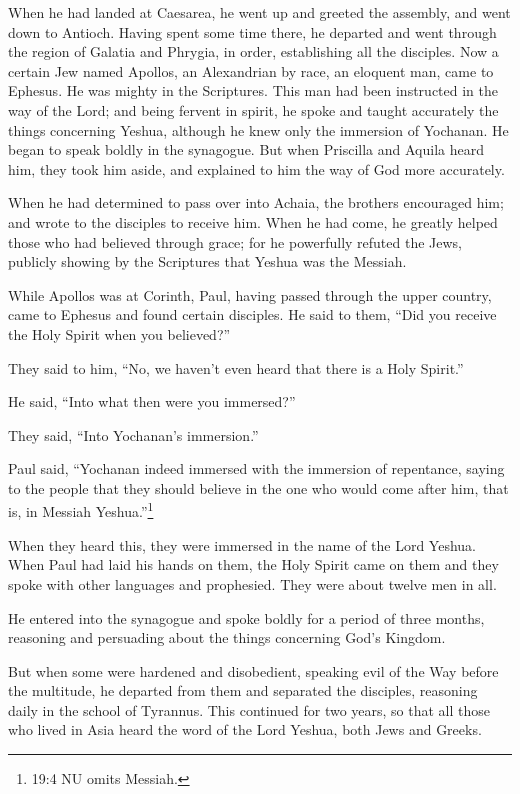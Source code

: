 \myverse{}When he had landed at Caesarea, he went up and greeted the assembly,
and went down to Antioch.
\myverse{}Having spent some time there, he departed and went through the region of
Galatia and Phrygia, in order, establishing all the disciples.
\myverse{}Now a certain Jew named Apollos, an Alexandrian by race, an eloquent man,
came to Ephesus. He was mighty in the Scriptures.
\myverse{}This man had been instructed in the way of the Lord; and being fervent in
spirit, he spoke and taught accurately the things concerning Yeshua, although he knew only the immersion
of Yochanan.
\myverse{}He began to speak boldly in the synagogue. But when Priscilla and Aquila
heard him, they took him aside, and explained to him the way of God more accurately.

\myverse{}When he had determined to pass over into Achaia, the brothers
encouraged him; and wrote to the disciples to receive him. When he had come, he greatly helped those who
had believed through grace;
\myverse{}for he powerfully refuted the Jews, publicly showing by the Scriptures that
Yeshua was the Messiah.


\mychapter{} \myverse*{}While Apollos was at Corinth, Paul, having passed through the
upper country, came to Ephesus and found certain disciples.
\myverse{}He said to them, “Did you receive the Holy Spirit when you believed?”

They said to him, “No, we haven’t even heard that there is a Holy Spirit.”

\myverse{}He said, “Into what then were you immersed?”

They said, “Into Yochanan’s immersion.”

\myverse{}Paul said, “Yochanan indeed immersed with the immersion of repentance,
saying to the people that they should believe in the one who would come after him, that is, in Messiah
Yeshua.”\footnote{19:4 NU omits Messiah.}

\myverse{}When they heard this, they were immersed in the name of the Lord Yeshua.
\myverse{}When Paul had laid his hands on them, the Holy Spirit came on them and they
spoke with other languages and prophesied.
\myverse{}They were about twelve men in all.

\myverse{}He entered into the synagogue and spoke boldly for a period of
three months, reasoning and persuading about the things concerning God’s Kingdom.

\myverse{}But when some were hardened and disobedient, speaking evil of
the Way before the multitude, he departed from them and separated the disciples, reasoning daily in the
school of Tyrannus.
\myverse{}This continued for two years, so that all those who lived in Asia heard the
word of the Lord Yeshua, both Jews and Greeks.


